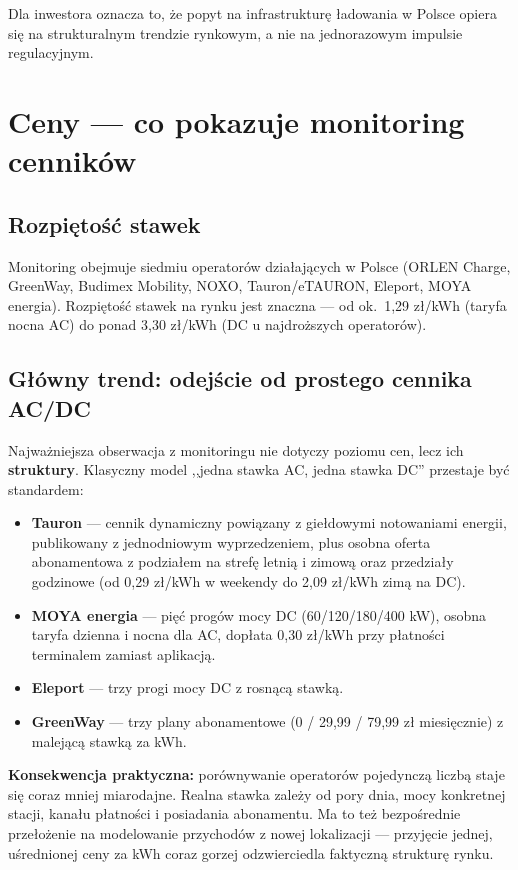\documentclass[11pt,a4paper]{article}
\begin{document}
	Dla inwestora oznacza to, że popyt na infrastrukturę ładowania w Polsce
	opiera się na strukturalnym trendzie rynkowym, a nie na jednorazowym
	impulsie regulacyjnym.
	
	\section{Ceny --- co pokazuje monitoring cenników}
	
	\subsection{Rozpiętość stawek}
	
	Monitoring obejmuje siedmiu operatorów działających w Polsce (ORLEN Charge,
	GreenWay, Budimex Mobility, NOXO, Tauron/eTAURON, Eleport, MOYA energia).
	Rozpiętość stawek na rynku jest znaczna --- od ok.\ 1,29 zł/kWh (taryfa nocna
	AC) do ponad 3,30 zł/kWh (DC u najdroższych operatorów).
	
	\subsection{Główny trend: odejście od prostego cennika AC/DC}
	
	Najważniejsza obserwacja z monitoringu nie dotyczy poziomu cen, lecz ich
	\textbf{struktury}. Klasyczny model ,,jedna stawka AC, jedna stawka DC''
	przestaje być standardem:
	
	\begin{itemize}[leftmargin=1.3em]
		\item \textbf{Tauron} --- cennik dynamiczny powiązany z giełdowymi notowaniami
		energii, publikowany z jednodniowym wyprzedzeniem, plus osobna oferta
		abonamentowa z podziałem na strefę letnią i zimową oraz przedziały godzinowe
		(od 0,29 zł/kWh w weekendy do 2,09 zł/kWh zimą na DC).
		\item \textbf{MOYA energia} --- pięć progów mocy DC (60/120/180/400 kW),
		osobna taryfa dzienna i nocna dla AC, dopłata 0,30 zł/kWh przy płatności
		terminalem zamiast aplikacją.
		\item \textbf{Eleport} --- trzy progi mocy DC z rosnącą stawką.
		\item \textbf{GreenWay} --- trzy plany abonamentowe (0 / 29,99 / 79,99 zł
		miesięcznie) z malejącą stawką za kWh.
	\end{itemize}
	
	\begin{infobox}
		\textbf{Konsekwencja praktyczna:} porównywanie operatorów pojedynczą liczbą
		staje się coraz mniej miarodajne. Realna stawka zależy od pory dnia, mocy
		konkretnej stacji, kanału płatności i posiadania abonamentu. Ma to też
		bezpośrednie przełożenie na modelowanie przychodów z nowej lokalizacji ---
		przyjęcie jednej, uśrednionej ceny za kWh coraz gorzej odzwierciedla
		faktyczną strukturę rynku.
	\end{infobox}
	
\end{document}
